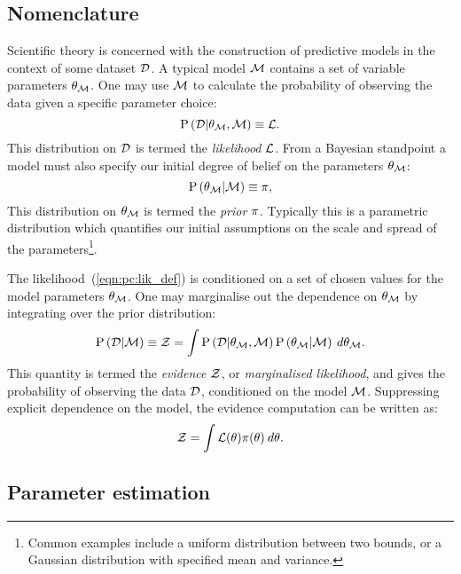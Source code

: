 \subsection{Nomenclature}
\label{sec:pc:nomenclature}
Scientific theory is concerned with the construction of predictive models in the context of some dataset $\mathcal{D}$.
A typical model $\mathcal{M}$ contains a set of variable parameters $\theta_{\mathcal{M}}$. One may use $\mathcal{M}$ to calculate the probability of observing the data given a specific parameter choice:
\begin{equation}
  \mathrm{P}\left(\mathcal{D}\middle|\theta_{\mathcal{M}},\mathcal{M}\right)\equiv\mathcal{L}.
  \label{eqn:pc:lik_def}
\end{equation}
This distribution on $\mathcal{D}$ is termed the {\em likelihood\/} $\mathcal{L}$. From a Bayesian standpoint a model must also specify our initial degree of belief on the parameters $\theta_{\mathcal{M}}$:
\begin{equation}
  \mathrm{P}\left(\theta_{\mathcal{M}}\middle|\mathcal{M}\right) \equiv \pi,
  \label{eqn:pc:prior_def}
\end{equation}
This distribution on $\theta_{\mathcal{M}}$ is termed the {\em prior\/} $\pi$. Typically this is a parametric distribution which quantifies our initial assumptions on the scale and spread of the parameters\footnote{Common examples include a uniform distribution between two bounds, or a Gaussian distribution with specified mean and variance.}.

The likelihood~(\ref{eqn:pc:lik_def}) is conditioned on a set of chosen values for the model parameters $\theta_{\mathcal{M}}$. One may marginalise out the dependence on $\theta_{\mathcal{M}}$ by integrating over the prior distribution:
\begin{equation}
  \mathrm{P}\left(\mathcal{D}\middle|\mathcal{M}\right) \equiv \mathcal{Z} = \int  \mathrm{P}\left(\mathcal{D}\middle|\theta_{\mathcal{M}},\mathcal{M}\right)\mathrm{P}\left(\theta_{\mathcal{M}}\middle|\mathcal{M}\right)\:d\theta_{\mathcal{M}}.
  \label{eqn:pc:ev_int}
\end{equation}
This quantity is termed the {\em evidence\/} $\mathcal{Z}$, or {\em marginalised likelihood}, and gives the probability of observing the data $\mathcal{D}$, conditioned on the model $\mathcal{M}$. Suppressing explicit dependence on the model, the evidence computation can be written as:
\begin{equation}
  \mathcal{Z} = \int \mathcal{L}(\theta)\pi(\theta)\:d\theta.
  \label{eqn:pc:evidence}
\end{equation}

\subsection{Parameter estimation}
\label{sec:pc:param_est}

